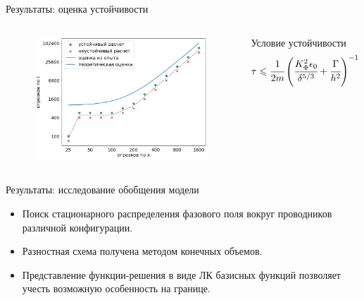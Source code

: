 \documentclass[aspectratio=169]{beamer}
\begin{document}
\begin{frame}{Результаты: оценка устойчивости}
\vspace{-0.4cm}
\begin{columns}
	\begin{figure}
		\includegraphics[width=\textwidth]{figures/stability_bounds.png}
	\end{figure}
	\begin{block}{Условие устойчивости}
		$$\tau \leqslant \cfrac{1}{2m} \left( \cfrac{K_\Phi^2 \epsilon_0}{\delta^{5/3}} + \cfrac{\Gamma}{h^2} \right)^{-1}$$
	\end{block}
\end{columns}
\end{frame}


\begin{frame}{Результаты: исследование обобщения модели}
\begin{itemize}
	\item Поиск стационарного распределения фазового поля вокруг проводников \\ различной конфигурации.
	\item Разностная схема получена методом конечных объемов.
	\item Представление функции-решения в виде ЛК базисных функций позволяет учесть возможную особенность на границе.
\end{itemize}
\end{frame}
\end{document}

